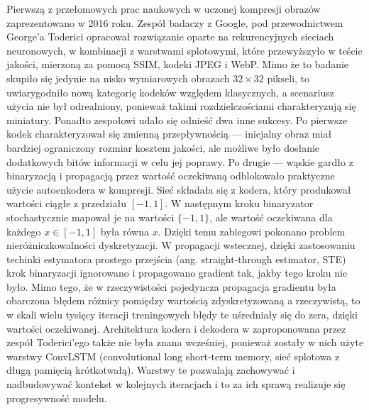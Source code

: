 Pierwszą z przełomowych prac naukowych w uczonej kompresji obrazów zaprezentowano w 2016 roku\cite{toderici2016variablerateimagecompression}. Zespół badaczy z Google, pod przewodnictwem George'a Toderici opracował rozwiązanie oparte na rekurencyjnych sieciach neuronowych, w kombinacji z warstwami splotowymi, które przewyższyło w teście jakości, mierzoną za pomocą SSIM, kodeki JPEG i WebP. Mimo że to badanie skupiło się jedynie na nisko wymiarowych obrazach \(32 \times 32 \) pikseli, to uwiarygodniło nową kategorię kodeków względem klasycznych, a scenariusz użycia nie był odrealniony, ponieważ takimi rozdzielczościami charakteryzują się miniatury. Ponadto zespołowi udało się odnieść dwa inne sukcesy. Po pierwsze kodek charakteryzował się zmienną przepływnością --- inicjalny obraz miał bardziej ograniczony rozmiar kosztem jakości, ale możliwe było dosłanie dodatkowych bitów informacji w celu jej poprawy. Po drugie --- wąskie gardło z binaryzacją i propagacją przez wartość oczekiwaną odblokowało praktyczne użycie autoenkodera w kompresji. Sieć składała się z kodera, który produkował wartości ciągłe z przedziału $[-1, 1]$. W następnym kroku binaryzator stochastycznie mapował je na wartości $\{-1, 1\}$, ale wartość oczekiwana dla każdego $x \in [-1, 1]$ była równa $x$. Dzięki temu zabiegowi pokonano problem nieróżniczkowalności dyskretyzacji. W propagacji wstecznej, dzięki zastosowaniu techinki estymatora prostego przejścia (ang. straight-through estimator, STE) krok binaryzacji ignorowano i propagowano gradient tak, jakby tego kroku nie było. Mimo tego, że w rzeczywistości pojedyncza propagacja gradientu była obarczona błędem różnicy pomiędzy wartością zdyskretyzowaną a rzeczywistą, to w skali wielu tysięcy iteracji treningowych błędy te uśredniały się do zera, dzięki wartości oczekiwanej. Architektura kodera i dekodera w zaproponowana przez zespół Toderici'ego także nie była znana wcześniej, ponieważ zostały w nich użyte warstwy ConvLSTM (convolutional long short-term memory, sieć splotowa z długą pamięcią krótkotwałą). Warstwy te pozwalają zachowywać i nadbudowywać kontekst w kolejnych iteracjach i to za ich sprawą realizuje się progresywność modelu.

